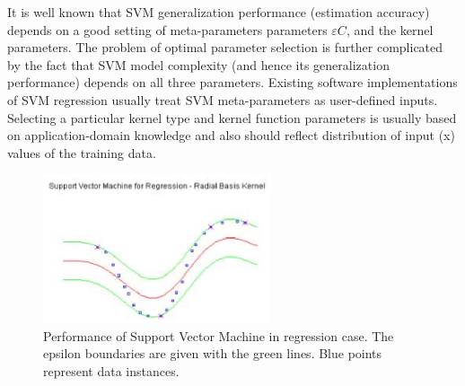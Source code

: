 It is well known that SVM generalization performance (estimation accuracy) depends on a 
good setting of meta-parameters parameters $\varepsilon C$,  and the kernel parameters.
The problem of optimal parameter selection is further complicated by the fact that SVM model
complexity (and hence its generalization performance) depends on all three parameters. 
Existing software implementations of SVM regression usually treat SVM meta-parameters 
as user-defined inputs. Selecting a particular kernel type and kernel function parameters 
is usually based on application-domain knowledge and also should reflect distribution of 
input (x) values of the training data.
\begin{figure}[htb] 
	\label{fig:svm_demo1}
	\centering
	\includegraphics[width=0.6\textwidth]{figures/svm_demo1}
	\caption{Performance of Support Vector Machine in regression case. 
	The epsilon boundaries are given with the green lines. Blue points represent data instances.}
\end{figure}

